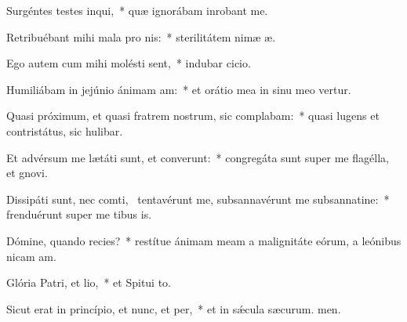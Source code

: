 \item Surgéntes testes inqui,~* quæ ignorábam inrobant me.
\item Retribuébant mihi mala pro nis:~* sterilitátem nimæ æ.
\item Ego autem cum mihi molésti sent,~* indubar cicio.
\item Humiliábam in jejúnio ánimam am:~* et orátio mea in sinu meo vertur.
\item Quasi próximum, et quasi fratrem nostrum, sic complabam:~* quasi lugens et contristátus, sic hulibar.
\item Et advérsum me lætáti sunt, et converunt:~* congregáta sunt super me flagélla, et gnovi.
\item Dissipáti sunt, nec comti,~\pscross{} tentavérunt me, subsannavérunt me subsannatine:~* frenduérunt super me tibus is.
\item Dómine, quando recies?~* restítue ánimam meam a malignitáte eórum, a leónibus nicam am.
\item Glória Patri, et lio,~* et Spitui to.
\item Sicut erat in princípio, et nunc, et per,~* et in sǽcula sæcurum. men.
